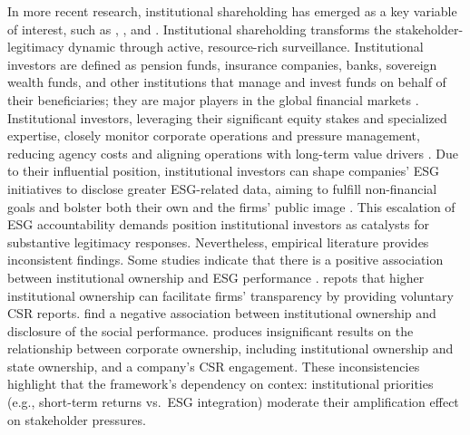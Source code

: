 \documentclass[
  authoryear]{elsarticle}
\begin{document}
In more recent research, institutional shareholding has emerged as a key
variable of interest, such as \citet{DYCK2019}, \citet{CHEN2020}, and
\citet{AMEEN2022}. \hspace{0pt}Institutional shareholding\hspace{0pt}
transforms the stakeholder-legitimacy dynamic through active,
resource-rich surveillance. Institutional investors are defined as
pension funds, insurance companies, banks, sovereign wealth funds, and
other institutions that manage and invest funds on behalf of their
beneficiaries; they are major players in the global financial markets
\citep{AMEEN2022}. Institutional investors, leveraging their significant
equity stakes and specialized expertise, closely monitor corporate
operations and pressure management, reducing agency costs and aligning
operations with long-term value drivers \citep{SHLEIFER1986}. Due to
their influential position, institutional investors can shape companies'
ESG initiatives to disclose greater ESG-related data, aiming to fulfill
non-financial goals and bolster both their own and the firms' public
image \citep{DYCK2019, GARCIA-SANCHEZ2020}. This escalation of ESG
accountability demands position institutional investors as catalysts for
substantive legitimacy responses. Nevertheless, empirical literature
provides inconsistent findings. Some studies indicate that there is a
positive association between institutional ownership and ESG performance
\citep{DYCK2019, CHEN2020, AMEEN2022, RAIMO2020}. \citet{ZHOU2019}
repots that higher institutional ownership can facilitate firms'
transparency by providing voluntary CSR reports. \citet{ALUCHNA2022}
find a negative association between institutional ownership and
disclosure of the social performance. \citet{QU2007} produces
insignificant results on the relationship between corporate ownership,
including institutional ownership and state ownership, and a company's
CSR engagement. These inconsistencies highlight that the framework's
dependency on contex: institutional priorities (e.g., short-term returns
vs.~ESG integration) moderate their amplification effect on stakeholder
pressures.
\end{document}
